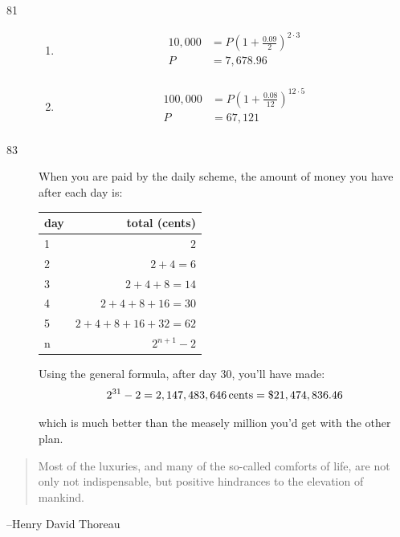 \documentclass{exam}
\begin{document}
\begin{description}
      \item[81]
        \begin{enumerate}[a]
          \item 
            \begin{align*}
              10,000 &= P  \left( 1 + \frac{0.09}{2} \right)^{2 \cdot 3} \\
              P      &= 7,678.96 \\
            \end{align*}

          \item 
            \begin{align*}
              100,000 &= P  \left( 1 + \frac{0.08}{12} \right)^{12 \cdot 5} \\
              P       &= 67,121 \\
            \end{align*}
        \end{enumerate}

      \item[83]
        When you are paid by the daily scheme, the amount of money you have after each day is:

        \begin{tabular}[H]{lr}
          \toprule
          day  & total (cents) \\
          \midrule
          1 & $2$ \\
          2 & $2 + 4 = 6$ \\
          3 & $2 + 4 + 8 = 14$ \\
          4 & $2 + 4 + 8 + 16 = 30$ \\
          5 & $2 + 4 + 8 + 16 + 32 = 62$ \\
          n & $2^{n + 1} - 2$ \\
          \bottomrule
        \end{tabular}

        Using the general formula, after day 30, you'll have made:
        \[
          2^{31} - 2 = \unit[2,147,483,646]{cents} = \$21,474,836.46
        \]

        which is much better than the measely million you'd get with the other plan.
    \end{description}

  \else
    \vspace{6 cm}
    \begin{quote}
      \begin{em}
        Most of the luxuries, and many of the so-called comforts of life, are not only not indispensable, but positive
        hindrances to the elevation of mankind.  
      \end{em}
    \end{quote}

    \hspace{1 cm} --Henry David Thoreau
  \fi
\end{document}
